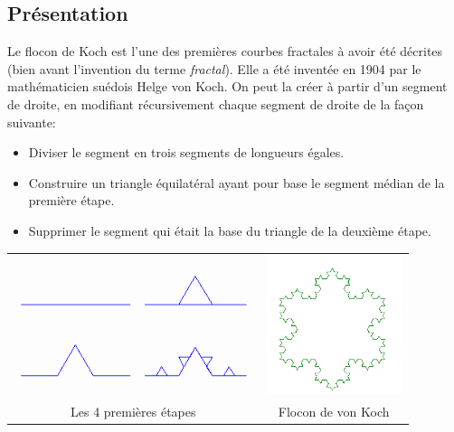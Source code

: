 \documentclass[a4paper,11pt]{article}
\begin{document}
\begin{Form}
\section{Présentation}
Le flocon de Koch est l'une des premières courbes fractales à avoir été décrites (bien avant l'invention du terme \emph{fractal}). Elle a été inventée en 1904 par le mathématicien suédois Helge von Koch. On peut la créer à partir d'un segment de droite, en modifiant récursivement chaque segment de droite de la façon suivante:
\begin{itemize}
\item Diviser le segment en trois segments de longueurs égales.
\item Construire un triangle équilatéral ayant pour base le segment médian de la première étape.
\item Supprimer le segment qui était la base du triangle de la deuxième étape.
\end{itemize}
\begin{center}
\begin{tabular}{cc}
\includegraphics[width=7cm]{ressources/koch_etapes.png}
&
\includegraphics[width=4cm]{ressources/flocon.png}\\
Les 4 premières étapes & Flocon de von Koch
\end{tabular} 
\end{center}
\begin{center}
\end{center}

\end{Form}
\end{document}
